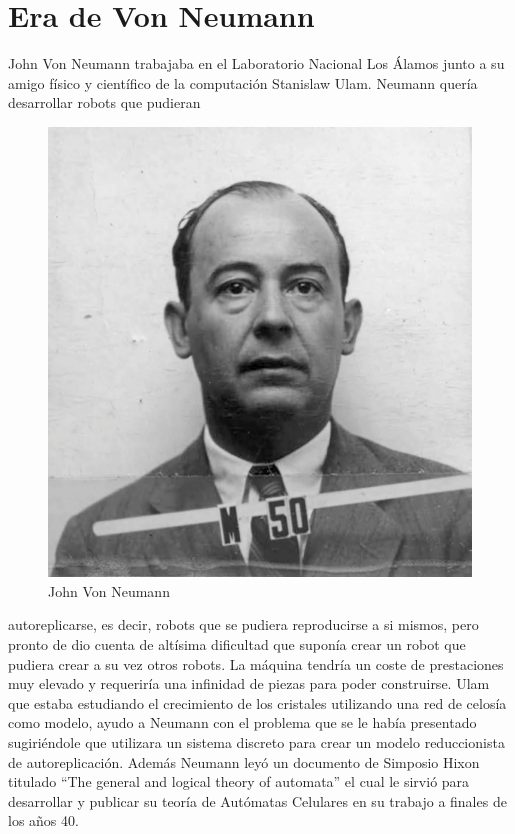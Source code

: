 \section{Era de Von Neumann} %
John Von Neumann trabajaba en el Laboratorio Nacional Los Álamos junto a su amigo físico y científico de la computación Stanislaw Ulam. Neumann quería desarrollar robots que pudieran 
\begin{figure}
\centering
\includegraphics[scale=3]{imagenes/neumann.png}
\caption{John Von Neumann}
\label{fig:neumann}
\end{figure}
autoreplicarse, es decir, robots que se pudiera reproducirse a si mismos, pero pronto de dio cuenta de altísima dificultad que suponía crear un robot que pudiera crear a su vez otros robots. La máquina tendría un coste de prestaciones muy elevado y requeriría una infinidad de piezas para poder construirse. Ulam que estaba estudiando el crecimiento de los cristales utilizando una red de celosía como modelo, ayudo a Neumann con el problema que se le había presentado sugiriéndole que utilizara un sistema discreto para crear un modelo reduccionista de autoreplicación. Además Neumann leyó un documento de Simposio Hixon titulado ``The general and logical theory of automata'' el cual le sirvió para desarrollar y publicar su teoría de Autómatas Celulares en su trabajo \cite{Teoria_Von_neumann} a finales de los años 40. \\

